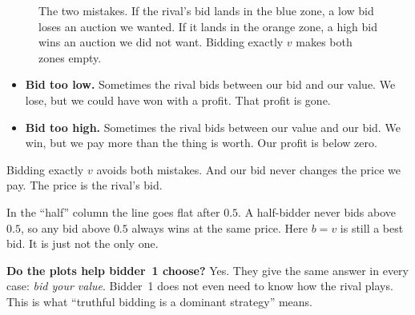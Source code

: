 \documentclass[11pt,a4paper]{article}
\begin{document}
\begin{figure}[h]
  \centering
  \caption{The two mistakes. If the rival's bid lands in the blue zone, a low bid loses an auction we wanted.
  If it lands in the orange zone, a high bid wins an auction we did not want. Bidding exactly $v$ makes both zones empty.}
  \label{fig:mistakes}
\end{figure}

\begin{itemize}
  \item \textbf{Bid too low.} Sometimes the rival bids between our bid and our value. We lose, but we could have won with a profit. That profit is gone.
  \item \textbf{Bid too high.} Sometimes the rival bids between our value and our bid. We win, but we pay more than the thing is worth. Our profit is below zero.
\end{itemize}
Bidding exactly $v$ avoids both mistakes. And our bid never changes the price we pay. The price is the rival's bid.

In the ``half'' column the line goes flat after $0.5$. A half-bidder never bids above $0.5$, so any bid above $0.5$ always wins at the same price.
Here $b = v$ is still a best bid. It is just not the only one.

\textbf{Do the plots help bidder~1 choose?} Yes. They give the same answer in every case: \emph{bid your value}.
Bidder~1 does not even need to know how the rival plays. This is what ``truthful bidding is a dominant strategy'' means.
\end{document}
